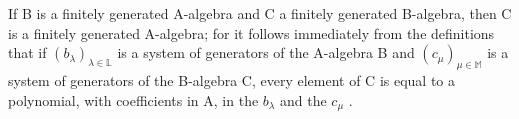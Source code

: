 If B is a finitely generated A-algebra and C a finitely generated B-algebra, then C is a finitely generated A-algebra; for it follows immediately from the definitions that if \((b_{\lambda})_{\lambda \in \mathbb{L}}\) is a system of generators of the A-algebra B and \((c_{\mu})_{\mu \in \mathbb{M}}\) is a system of generators of the B-algebra C, every element of C is equal to a polynomial, with coefficients in A, in the \(b_{\lambda}\) and the \(c_{\mu}\) .

